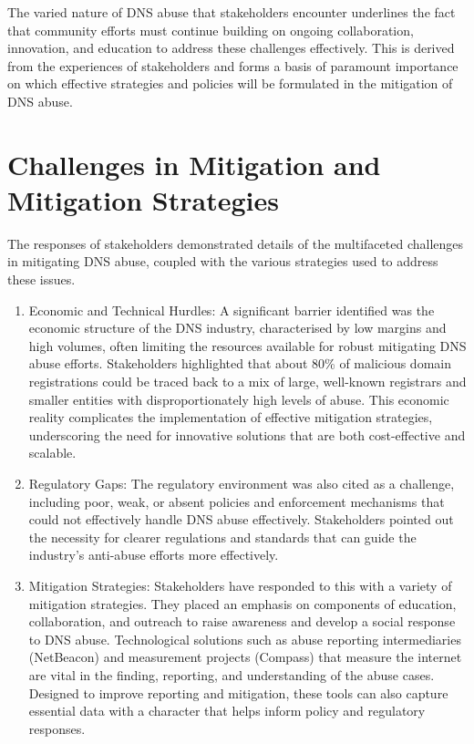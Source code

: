 The varied nature of DNS abuse that stakeholders encounter underlines the fact that community efforts must continue building on ongoing collaboration, innovation, and education to address these challenges effectively. This is derived from the experiences of stakeholders and forms a basis of paramount importance on which effective strategies and policies will be formulated in the mitigation of DNS abuse.

\section{Challenges in Mitigation and Mitigation Strategies} 

The responses of stakeholders demonstrated details of the multifaceted challenges in mitigating DNS abuse, coupled with the various strategies used to address these issues.
\begin{enumerate}
    \item Economic and Technical Hurdles: A significant barrier identified was the economic structure of the DNS industry, characterised by low margins and high volumes, often limiting the resources available for robust mitigating DNS abuse efforts. Stakeholders highlighted that about 80\% of malicious domain registrations could be traced back to a mix of large, well-known registrars and smaller entities with disproportionately high levels of abuse. This economic reality complicates the implementation of effective mitigation strategies, underscoring the need for innovative solutions that are both cost-effective and scalable.
    
    \item Regulatory Gaps: The regulatory environment was also cited as a challenge, including poor, weak, or absent policies and enforcement mechanisms that could not effectively handle DNS abuse effectively. Stakeholders pointed out the necessity for clearer regulations and standards that can guide the industry's anti-abuse efforts more effectively.
    \item Mitigation Strategies: Stakeholders have responded to this with a variety of mitigation strategies. They placed an emphasis on components of education, collaboration, and outreach to raise awareness and develop a social response to DNS abuse. Technological solutions such as abuse reporting intermediaries (NetBeacon) and measurement projects (Compass) that measure the internet are vital in the finding, reporting, and understanding of the abuse cases. Designed to improve reporting and mitigation, these tools can also capture essential data with a character that helps inform policy and regulatory responses.
    
    
\end{enumerate}


